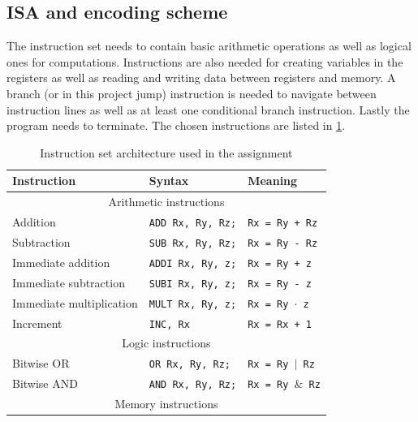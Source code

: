 \documentclass[a4paper, english]{article}
\numberwithin{equation}{section}
\begin{document}
\subsection{ISA and encoding scheme}\label{sec:isa}
The instruction set needs to contain basic arithmetic operations as well as logical ones for computations. Instructions are also needed for creating variables in the registers as well as reading and writing data between registers and memory. A branch (or in this project jump) instruction is needed to navigate between instruction lines as well as at least one conditional branch instruction. Lastly the program needs to terminate. The chosen instructions are listed in \cref{tbl:ISA}.
\begin{table}
    \centering
    \caption{Instruction set architecture used in the assignment}\label{tbl:ISA}
    \begin{tabular}{lll}
        \toprule
        \textbf{Instruction}     & \textbf{Syntax}          & \textbf{Meaning}                 \\
        \midrule
        \multicolumn{3}{c}{Arithmetic instructions}                                            \\
        \midrule
        Addition                 & \texttt{ADD Rx, Ry, Rz;} & \texttt{Rx = Ry + Rz}            \\
        Subtraction              & \texttt{SUB Rx, Ry, Rz;} & \texttt{Rx = Ry - Rz}            \\
        Immediate addition       & \texttt{ADDI Rx, Ry, z;} & \texttt{Rx = Ry + z}             \\
        Immediate subtraction    & \texttt{SUBI Rx, Ry, z;} & \texttt{Rx = Ry - z}             \\
        Immediate multiplication & \texttt{MULT Rx, Ry, z;} & \texttt{Rx = Ry \(\cdot\) z}     \\
        Increment                & \texttt{INC, Rx}         & \texttt{Rx = Rx + 1}             \\
        \midrule
        \multicolumn{3}{c}{Logic instructions}                                                 \\
        \midrule
        Bitwise OR               & \texttt{OR Rx, Ry, Rz;}  & \texttt{Rx = Ry \(\vert\) Rz}    \\
        Bitwise AND              & \texttt{AND Rx, Ry, Rz;} & \texttt{Rx = Ry \(\&\) Rz}       \\
        \midrule
        \multicolumn{3}{c}{Memory instructions}                                                \\

\end{tabular}
\end{table}
\end{document}
